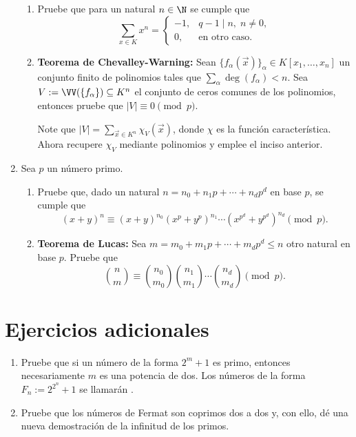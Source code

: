 \documentclass[11pt, reqno]{amsart}
\begin{document}
\begin{enumerate}
\begin{enumerate}
			\item Pruebe que para un natural $n \in \N$ se cumple que
				\[
					\sum_{x \in K} x^n =
					\begin{cases}
						-1, & q-1\mid n, \; n \ne 0, \\
						0, & \text{en otro caso.}
					\end{cases}
				\]

			\item \textbf{Teorema de Chevalley-Warning:}
				\lookright
				Sean $\{ f_\alpha(\vec x) \}_\alpha \in K[x_1, \dots, x_n]$ un conjunto finito de polinomios tales que $\sum_{\alpha} \deg(f_\alpha) < n$.
				Sea $V := \VV(\{ f_\alpha \}) \subseteq K^n$ el conjunto de ceros comunes de los polinomios, entonces pruebe que $|V| \equiv 0 \pmod p$.

				\begin{hint}
					Note que $|V| = \sum_{\vec x \in K^n} \chi_V(\vec x)$, donde $\chi$ es la función característica.
					Ahora recupere $\chi_V$ mediante polinomios y emplee el inciso anterior.
				\end{hint}
		\end{enumerate}
		\nocite{serre:arithmetic}

	\item Sea $p$ un número primo.
		\begin{enumerate}
			\item Pruebe que, dado un natural $n = n_0 + n_1p + \cdots + n_dp^d$ en base $p$, se cumple que
				\[
					(x + y)^n \equiv (x + y)^{n_0}(x^p + y^p)^{n_1} \cdots \left( x^{p^d} + y^{p^d} \right)^{n_d} \pmod p.
				\]

			\item \textbf{Teorema de Lucas:}
				Sea $m = m_0 + m_1p + \cdots + m_dp^d \le n$ otro natural en base $p$.
				Pruebe que
				\[
					\binom{n}{m} \equiv \binom{n_0}{m_0} \binom{n_1}{m_1} \cdots \binom{n_d}{m_d} \pmod p.
				\]
		\end{enumerate}
\end{enumerate}

\appendix
\section{Ejercicios adicionales}
\begin{enumerate}
	\item Pruebe que si un número de la forma $2^m + 1$ es primo, entonces necesariamente $m$ es una potencia de dos.
		Los números de la forma $F_n := 2^{2^n} + 1$ se llamarán .

	\item\lookright
		Pruebe que los números de Fermat son coprimos dos a dos y, con ello, dé una nueva demostración de la infinitud de los primos.
\end{enumerate}
\end{document}
